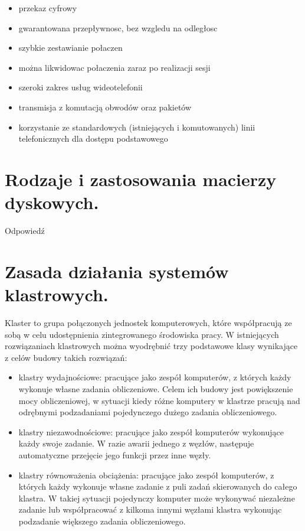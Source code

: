 \documentclass[12pt,a4paper]{article}
\begin{document}
	\begin{itemize}
		\item przekaz cyfrowy
		\item gwarantowana przepływnosc, bez wzgledu na odległosc
		\item szybkie zestawianie połaczen
		\item można likwidowac połaczenia zaraz po realizacji sesji
		\item szeroki zakres usług wideotelefonii
		\item transmisja z komutacją obwodów oraz pakietów
		\item korzystanie ze standardowych (istniejących i komutowanych) linii telefonicznych dla dostępu podstawowego
	\end{itemize}

	\section{Rodzaje i zastosowania macierzy dyskowych.}
	Odpowiedź

	\section{Zasada działania systemów klastrowych.}
	Klaster to grupa połączonych jednostek komputerowych, które współpracują ze sobą w celu udostępnienia zintegrowanego środowiska pracy. W istniejących rozwiązaniach klastrowych można wyodrębnić trzy podstawowe klasy wynikające z celów budowy takich rozwiązań:
	
	\begin{itemize}
		\item klastry wydajnościowe: pracujące jako zespół komputerów, z których każdy wykonuje własne zadania obliczeniowe. Celem ich budowy jest powiększenie mocy obliczeniowej, w sytuacji kiedy różne komputery w klastrze pracują nad odrębnymi podzadaniami pojedynczego dużego zadania obliczeniowego.
	
		\item klastry niezawodnościowe: pracujące jako zespół komputerów wykonujące każdy swoje zadanie. W razie awarii jednego z węzłów, następuje automatyczne przejęcie jego funkcji przez inne węzły.
		
		\item klastry równoważenia obciążenia: pracujące jako zespół komputerów, z których każdy wykonuje własne zadanie z puli zadań skierowanych do całego klastra. W takiej sytuacji pojedynczy komputer może wykonywać niezależne zadanie lub współpracować z kilkoma innymi węzłami klastra wykonując podzadanie większego zadania obliczeniowego.
	\end{itemize}
	
\end{document}
